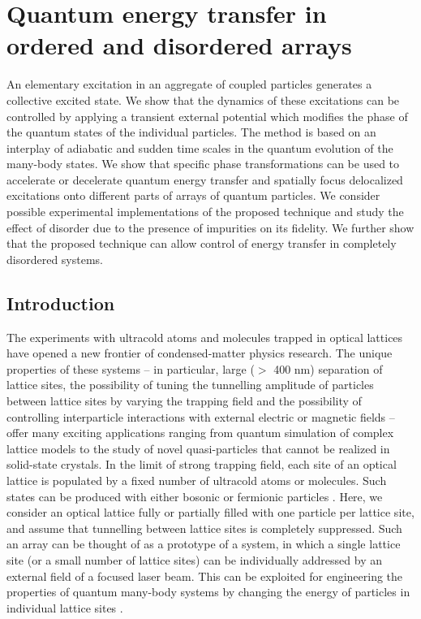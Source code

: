 
\chapter{Quantum energy transfer in ordered and disordered arrays}
\label{ch:wave packet}

An elementary excitation in an aggregate of coupled particles
generates a collective excited state. We show that the dynamics of
these excitations can be controlled by applying a transient external
potential which modifies the phase of the quantum states of the 
individual particles. The method is based on an interplay of
adiabatic and sudden time scales in the quantum evolution of the many-body states. We show that
specific phase transformations can be used to accelerate or
decelerate quantum energy transfer and spatially focus delocalized
excitations onto different parts of  arrays of quantum
particles. {We consider possible experimental implementations of
the proposed technique and study the effect of disorder due to
the presence of impurities on its fidelity. {We further show
that the proposed technique can allow control of energy transfer  in completely disordered systems.}}


\section{Introduction}
\label{sec:energyTransferIntro}

The experiments with ultracold atoms and molecules trapped in optical lattices have opened a new frontier of 
condensed-matter physics research. The unique properties of these systems -- in particular, large ($>$ 400 nm) 
separation of lattice sites, the possibility of tuning the tunnelling amplitude of particles  between lattice sites by
 varying the trapping field and the possibility of controlling interparticle interactions with external electric or 
magnetic fields -- offer many exciting applications ranging from quantum simulation of complex lattice models 
\cite{Kohl2005, Barnett2006, micheli2006, Brennen2007, Buchler2007, McKay2008, Jordens2008, Schneider2008, 
Carr, Carr2, Trefzger2010, Kestner2011, gorshkov, gorshkov2} to the study of novel quasi-particles \cite{biexcitons}
 that cannot be realized in solid-state crystals.
 In the limit of strong trapping field,  each site of an optical lattice is populated by a fixed number of ultracold atoms
 or molecules. 
Such states can be produced with either bosonic or fermionic particles \cite{Greiner2002, Jordens2008}. Here, we consider
 an optical lattice fully or partially filled with one particle per lattice site, and assume that tunnelling between lattice
 sites is completely suppressed. Such an array can be thought of as a prototype  of a  system,
 in which a single lattice site (or a small number of lattice sites) can be individually addressed
by an external field of a focused laser beam. This can be exploited for engineering the properties of quantum 
many-body systems by changing the energy of particles in individual lattice sites \cite{our-2012-prl}.




